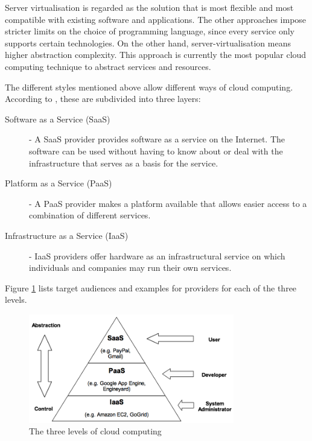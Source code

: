 Server virtualisation is regarded as the solution that is most flexible and most compatible with existing software and applications. The other approaches impose stricter limits on the choice of programming language, since every service only supports certain technologies.	On the other hand, server-virtualisation means higher abstraction complexity. This approach is currently the most popular cloud computing technique to abstract services and resources.

The different styles mentioned above allow different ways of cloud computing. According to \cite{cloud:enzyklopaedie}, these are subdivided into three layers:

\begin{description}
\item[Software as a Service (SaaS)] - A SaaS provider provides software as a service on the Internet. The software can be used without having to know about or deal with the infrastructure that serves as a basis for the service.
\item[Platform as a Service (PaaS)] - A PaaS provider makes a platform available that allows easier access to a combination of different services.
\item[Infrastructure as a Service (IaaS)] - IaaS providers offer hardware as an infrastructural service on which individuals and companies may run their own services.
\end{description}

Figure \ref{fig:aas} lists target audiences and examples for providers for each of the three levels.

\medskip
\begin{figure}[ht] 
  \begin{center}
    \includegraphics[width=0.8\textwidth]{grafik/cc-services} 
  \end{center}
  \caption{The three levels of cloud computing}
  \label{fig:aas}
\end{figure}



